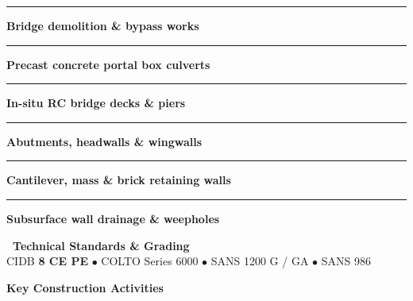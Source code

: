 \documentclass[a4paper,11pt]{article}
\begin{document}
\begin{minipage}[t]{0.34\textwidth}
    \vspace{0pt}
    \begin{tcolorbox}[
        enhanced, colback=mhoffwhite, colframe=mhnavy, boxrule=0.9pt, arc=4pt,
        title={\bfseries\color{white}\faArchway\ Scope of Work},
        colbacktitle=mhnavy, left=7pt, right=7pt, top=5pt, bottom=5pt, drop shadow=black!5
    ]
        \fontsize{7.8pt}{10.8pt}\selectfont
        \textcolor{mhnavy}{\rule{3.5pt}{3.5pt}}\hspace{4pt}\textbf{Bridge demolition \& bypass works}\\
        \textcolor{mhnavy}{\rule{3.5pt}{3.5pt}}\hspace{4pt}\textbf{Precast concrete portal box culverts}\\
        \textcolor{mhnavy}{\rule{3.5pt}{3.5pt}}\hspace{4pt}\textbf{In-situ RC bridge decks \& piers}\\
        \textcolor{mhnavy}{\rule{3.5pt}{3.5pt}}\hspace{4pt}\textbf{Abutments, headwalls \& wingwalls}\\
        \textcolor{mhnavy}{\rule{3.5pt}{3.5pt}}\hspace{4pt}\textbf{Cantilever, mass \& brick retaining walls}\\
        \textcolor{mhnavy}{\rule{3.5pt}{3.5pt}}\hspace{4pt}\textbf{Subsurface wall drainage \& weepholes}
    \end{tcolorbox}

    \vspace{0.12cm}

    \begin{tcolorbox}[
        enhanced, colback=white, colframe=mhlightgray, boxrule=0.8pt, arc=4pt,
        left=6pt, right=6pt, top=5pt, bottom=5pt, drop shadow=black!3
    ]
        {\fontsize{7.5pt}{9.6pt}\selectfont\bfseries\color{mhnavy}\faCheckDouble\ Technical Standards \& Grading}\\[2pt]
        {\fontsize{7.3pt}{9.4pt}\selectfont\color{mhtextmuted}
        CIDB \textbf{8 CE PE} $\bullet$ COLTO Series 6000 $\bullet$ SANS 1200 G / GA $\bullet$ SANS 986}
    \end{tcolorbox}
\end{minipage}

\vfill

{\large\bfseries\color{mhnavy} Key Construction Activities}
\vspace{0.10cm}
\end{document}
